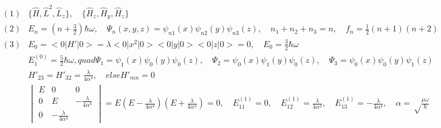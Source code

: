 \documentclass[UTF8]{ctexart}
\begin{document}
\begin{equation*}
  \begin{aligned}
    (1) & \{\hat H,\hat L^2,\hat L_z\},\quad\{\hat H_z,\hat H_y,\hat H_z\}                                \\
    (2) & E_n=(n+\frac{3}{2})\hbar\omega,\quad\Psi_n(x,y,z)=\psi_{n1}(x)\psi_{n2}(y)\psi_{n3}(z),\quad
    n_1+n_2+n_3=n,\quad f_n=\frac{1}{2}(n+1)(n+2)                                                         \\
    (3) & E_0=<0\lvert H'\rvert0>=\lambda<0\lvert x^2\rvert0><0\lvert y\rvert0><0\lvert z\rvert0>=0,\quad
    E_0=\frac{3}{2}\hbar\omega                                                                            \\
        & E_1^{(0)}=\frac{5}{2}\hbar\omega,quad\Psi_1=\psi_1(x)\psi_0(y)\psi_0(z),\quad
    \Psi_2=\psi_0(x)\psi_1(y)\psi_0(z),\quad\Psi_3=\psi_0(x)\psi_0(y)\psi_1(z)                            \\
        & {H'}_{23}={H'}_{32}=\frac{\lambda}{4\alpha^4},\quad else {H'}_{mn}=0                            \\
        & \begin{vmatrix}
      E & 0                          & 0                          \\
      0 & E                          & -\frac{\lambda}{4\alpha^4} \\
      0 & -\frac{\lambda}{4\alpha^4}
    \end{vmatrix}=E(E-\frac{\lambda}{4\alpha^4})(E+\frac{\lambda}{4\alpha^4})=0,\quad
    E_{11}^{(1)}=0,\quad E_{12}^{(1)}=\frac{\lambda}{4\alpha^4},\quad
    E_{13}^{(1)}=-\frac{\lambda}{4\alpha^4},\quad\alpha=\sqrt\frac{\mu\omega}{\hbar}
  \end{aligned}
\end{equation*}
\end{document}
